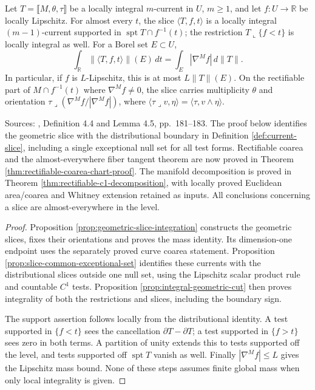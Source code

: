 \begin{theorem}\label{thm:integral-current-slicing}
Let $T=\llbracket M,\theta,\tau\rrbracket$ be a locally integral $m$-current in $U$, $m\geq1$, and let $f:U\to\mathbb R$ be locally Lipschitz. For almost every $t$, the slice $\langle T,f,t\rangle$ is a locally integral $(m-1)$-current supported in $\operatorname{spt}T\cap f^{-1}(t)$; the restriction $T\llcorner\{f<t\}$ is locally integral as well. For a Borel set $E\subset U$,
\[
 \int_{\mathbb R}\|\langle T,f,t\rangle\|(E)\,dt
 =\int_E|\nabla^M f|\,d\|T\|.
\]
In particular, if $f$ is $L$-Lipschitz, this is at most $L\|T\|(E)$. On the rectifiable part of $M\cap f^{-1}(t)$ where $\nabla^M f\ne0$, the slice carries multiplicity $\theta$ and orientation $\tau\mathbin{\lrcorner}(\nabla^M f/|\nabla^M f|)$, where
$\langle\tau\mathbin{\lrcorner}v,\eta\rangle=\langle\tau,v\wedge\eta\rangle$.

Sources: \cite{Sim18}, Definition 4.4 and Lemma 4.5, pp.~181--183. The proof below identifies the geometric slice with the distributional boundary in Definition \ref{def:current-slice}, including a single exceptional null set for all test forms. Rectifiable coarea and the almost-everywhere fiber tangent theorem are now proved in Theorem \ref{thm:rectifiable-coarea-chart-proof}. The manifold decomposition is proved in Theorem \ref{thm:rectifiable-c1-decomposition}, with locally proved Euclidean area/coarea and Whitney extension retained as inputs. All conclusions concerning a slice are almost-everywhere in the level.
\end{theorem}
\begin{proof}
Proposition \ref{prop:geometric-slice-integration} constructs the geometric slices, fixes their orientations and proves the mass identity. Its dimension-one endpoint uses the separately proved curve coarea statement. Proposition \ref{prop:slice-common-exceptional-set} identifies these currents with the distributional slices outside one null set, using the Lipschitz scalar product rule and countable $C^1$ tests. Proposition \ref{prop:integral-geometric-cut} then proves integrality of both the restrictions and slices, including the boundary sign.

The support assertion follows locally from the distributional identity. A test supported in $\{f<t\}$ sees the cancellation $\partial T-\partial T$; a test supported in $\{f>t\}$ sees zero in both terms. A partition of unity extends this to tests supported off the level, and tests supported off $\operatorname{spt}T$ vanish as well. Finally $|\nabla^Mf|\leq L$ gives the Lipschitz mass bound. None of these steps assumes finite global mass when only local integrality is given.
\end{proof}

